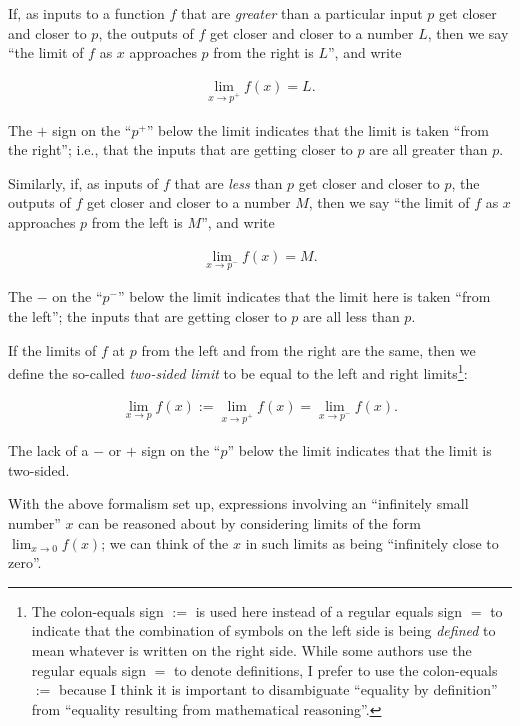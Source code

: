 If, as inputs to a function $f$ that are \textit{greater} than a particular input $p$ get closer and closer to $p$, the outputs of $f$ get closer and closer to a number $L$, then we say ``the limit of $f$ as $x$ approaches $p$ from the right is $L$'', and write

\begin{align*}
    \lim_{x \rightarrow p^+} f(x) = L.
\end{align*}

The $+$ sign on the ``$p^+$'' below the limit indicates that the limit is taken ``from the right''; i.e., that the inputs that are getting closer to $p$ are all greater than $p$.

Similarly, if, as inputs of $f$ that are \textit{less} than $p$ get closer and closer to $p$, the outputs of $f$ get closer and closer to a number $M$, then we say ``the limit of $f$ as $x$ approaches $p$ from the left is $M$'', and write

\begin{align*}
    \lim_{x \rightarrow p^-} f(x) = M.
\end{align*}

The $-$ on the ``$p^-$'' below the limit indicates that the limit here is taken ``from the left''; the inputs that are getting closer to $p$ are all less than $p$.

If the limits of $f$ at $p$ from the left and from the right are the same, then we define the so-called \textit{two-sided limit} to be equal to the left and right limits\footnote{The colon-equals sign $:=$ is used here instead of a regular equals sign $=$ to indicate that the combination of symbols on the left side is being \textit{defined} to mean whatever is written on the right side. While some authors use the regular equals sign $=$ to denote definitions, I prefer to use the colon-equals $:=$ because I think it is important to disambiguate ``equality by definition'' from ``equality resulting from mathematical reasoning''.}:

\begin{align*}
    \lim_{x \rightarrow p} f(x) 
    := \lim_{x \rightarrow p^+} f(x) 
    = \lim_{x \rightarrow p^-} f(x).
\end{align*}

The lack of a $-$ or $+ $ sign on the ``$p$'' below the limit indicates that the limit is two-sided.

With the above formalism set up, expressions involving an ``infinitely small number'' $x$ can be reasoned about by considering limits of the form $\lim_{x \rightarrow 0} f(x)$; we can think of the $x$ in such limits as being ``infinitely close to zero''.

